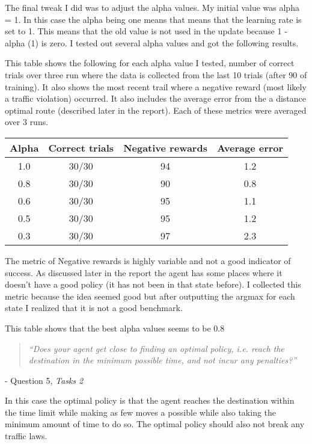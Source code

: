 \documentclass{article}
\newcommand{\chapquote}[3]
  {\begin{quotation} 
   \textit{#1} 
   \end{quotation} 
   \begin{flushright} - #2, 
   \textit{#3}
   \end{flushright} 
  }
\begin{document}
The final tweak I did was to adjust the alpha values. My initial value was alpha = 1. In this case the alpha being one means that means that the learning rate is set to 1. This means that the old value is not used in the update because 1 - alpha (1) is zero. I tested out several alpha values and got the following results.

This table shows the following for each alpha value I tested, number of correct trials over three run where the data is collected from the last 10 trials (after 90 of training). It also shows the most recent trail where a negative reward (most likely a traffic violation) occurred. It also includes the average error from the a distance optimal route (described later in the report). Each of these metrics were averaged over 3 runs.

\begin{center}
\begin{tabular}{ | c | c | c | c | }

\hline
Alpha & Correct trials & Negative rewards & Average error \\
\hline
1.0 & 30/30 & 94 & 1.2 \\
\hline
0.8 & 30/30 & 90 & 0.8 \\
\hline
0.6 & 30/30 & 95 & 1.1 \\
\hline
0.5 & 30/30 & 95 & 1.2 \\
\hline
0.3 & 30/30 & 97 & 2.3 \\
\hline

\end{tabular}
\end{center}

The metric of Negative rewards is highly variable and not a good indicator of success. As discussed later in the report the agent has some places where it doesn't have a good policy (it has not been in that state before). I collected this metric because the idea seemed good but after outputting the argmax for each state I realized that it is not a good benchmark.

This table shows that the best alpha values seems to be 0.8 

\chapquote{``Does your agent get close to finding an optimal policy, i.e. reach the destination in the minimum possible time, and not incur any penalties?''}{Question 5}{Tasks 2}

In this case the optimal policy is that the agent reaches the destination within the time limit while making as few moves a possible while also taking the minimum amount of time to do so. The optimal policy should also not break any traffic laws.
\end{document}
